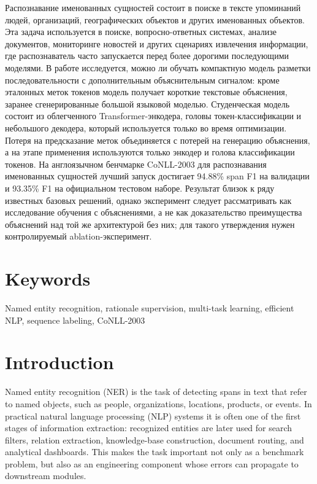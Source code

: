 \documentclass[a4paper,12pt]{extarticle}
\begin{document}
Распознавание именованных сущностей состоит в поиске в тексте упоминаний людей, организаций, географических объектов и других именованных объектов. Эта задача используется в поиске, вопросно-ответных системах, анализе документов, мониторинге новостей и других сценариях извлечения информации, где распознаватель часто запускается перед более дорогими последующими моделями. В работе исследуется, можно ли обучать компактную модель разметки последовательности с дополнительным объяснительным сигналом: кроме эталонных меток токенов модель получает короткие текстовые объяснения, заранее сгенерированные большой языковой моделью. Студенческая модель состоит из облегченного Transformer-энкодера, головы токен-классификации и небольшого декодера, который используется только во время оптимизации. Потеря на предсказание меток объединяется с потерей на генерацию объяснения, а на этапе применения используются только энкодер и голова классификации токенов. На англоязычном бенчмарке CoNLL-2003 для распознавания именованных сущностей лучший запуск достигает 94.88\% span F1 на валидации и 93.35\% F1 на официальном тестовом наборе. Результат близок к ряду известных базовых решений, однако эксперимент следует рассматривать как исследование обучения с объяснениями, а не как доказательство преимущества объяснений над той же архитектурой без них; для такого утверждения нужен контролируемый ablation-эксперимент.


\section*{Keywords}
Named entity recognition, rationale supervision, multi-task learning, efficient NLP, sequence labeling, CoNLL-2003

\newpage

\section{Introduction}
\label{sec:introduction}

Named entity recognition (NER) is the task of detecting spans in text that refer to named objects, such as people, organizations, locations, products, or events. In practical natural language processing (NLP) systems it is often one of the first stages of information extraction: recognized entities are later used for search filters, relation extraction, knowledge-base construction, document routing, and analytical dashboards. This makes the task important not only as a benchmark problem, but also as an engineering component whose errors can propagate to downstream modules.
\end{document}
